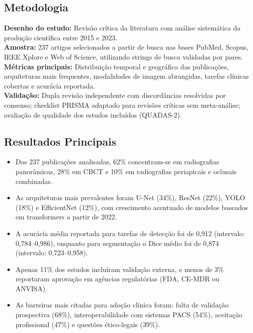 \subsection{Metodologia}
\textbf{Desenho do estudo:} Revisão crítica da literatura com análise
sistemática da produção científica entre 2015 e 2023. \\
\textbf{Amostra:} 237 artigos selecionados a partir de busca nas bases
PubMed, Scopus, IEEE Xplore e Web of Science, utilizando strings de busca
validadas por pares. \\
\textbf{Métricas principais:} Distribuição temporal e geográfica das
publicações, arquiteturas mais frequentes, modalidades de imagem
abrangidas, tarefas clínicas cobertas e acurácia reportada. \\
\textbf{Validação:} Dupla revisão independente com discordâncias resolvidas
por consenso; checklist PRISMA adaptado para revisões críticas sem
meta-análise; avaliação de qualidade dos estudos incluídos (QUADAS-2).

\subsection{Resultados Principais}
\begin{itemize}
  \item Das 237 publicações analisadas, 62\% concentram-se em radiografias
        panorâmicas, 28\% em CBCT e 10\% em radiografias periapicais e
        oclusais combinadas.
  \item As arquiteturas mais prevalentes foram U-Net (34\%), ResNet (22\%),
        YOLO (18\%) e EfficientNet (12\%), com crescimento acentuado de
        modelos baseados em transformers a partir de 2022.
  \item A acurácia média reportada para tarefas de detecção foi de 0,912
        (intervalo: 0,784--0,986), enquanto para segmentação o Dice médio
        foi de 0,874 (intervalo: 0,723--0,958).
  \item Apenas 11\% dos estudos incluíram validação externa, e menos de
        3\% reportaram aprovação em agências regulatórias (FDA, CE-MDR ou
        ANVISA).
  \item As barreiras mais citadas para adoção clínica foram: falta de
        validação prospectiva (68\%), interoperabilidade com sistemas
        PACS (54\%), aceitação profissional (47\%) e questões ético-legais
        (39\%).
\end{itemize}


